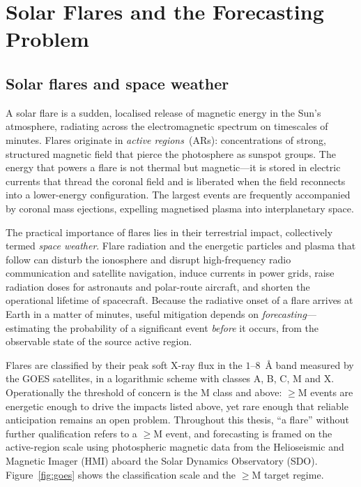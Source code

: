 \chapter{Solar Flares and the Forecasting Problem}
\label{ch:intro}

\section{Solar flares and space weather}

A solar flare is a sudden, localised release of magnetic energy in the Sun's
atmosphere, radiating across the electromagnetic spectrum on timescales of
minutes. Flares originate in \emph{active regions}~(ARs): concentrations of
strong, structured magnetic field that pierce the photosphere as sunspot
groups. The energy that powers a flare is not thermal but magnetic---it is
stored in electric currents that thread the coronal field and is liberated when
the field reconnects into a lower-energy configuration. The largest events are
frequently accompanied by coronal mass ejections, expelling magnetised plasma
into interplanetary space.

The practical importance of flares lies in their terrestrial impact, collectively
termed \emph{space weather}. Flare radiation and the energetic particles and
plasma that follow can disturb the ionosphere and disrupt high-frequency radio
communication and satellite navigation, induce currents in power grids, raise
radiation doses for astronauts and polar-route aircraft, and shorten the
operational lifetime of spacecraft. Because the radiative onset of a flare
arrives at Earth in a matter of minutes, useful mitigation depends on
\emph{forecasting}---estimating the probability of a significant event
\emph{before} it occurs, from the observable state of the source active region.

Flares are classified by their peak soft X-ray flux in the $1$--$8$~\AA{} band
measured by the GOES satellites, in a logarithmic scheme with classes A, B, C,
M and X. Operationally the threshold of concern is the M class and above:
$\geq$M events are energetic enough to drive the impacts listed above, yet rare
enough that reliable anticipation remains an open problem. Throughout this
thesis, ``a flare'' without further qualification refers to a $\geq$M event, and
forecasting is framed on the active-region scale using photospheric magnetic
data from the Helioseismic and Magnetic Imager (HMI) aboard the Solar Dynamics
Observatory (SDO). Figure~\ref{fig:goes} shows the classification scale and the
$\geq$M target regime.


